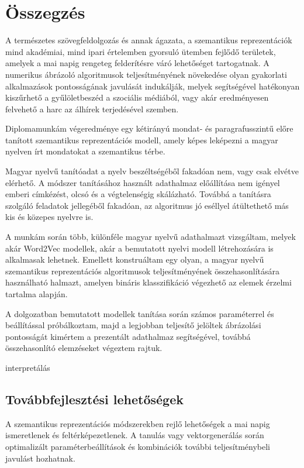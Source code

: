 \chapter{Összegzés} %
\label{ch:sum}

A természetes szövegfeldolgozás és annak ágazata, a szemantikus reprezentációk mind akadémiai, mind ipari értelemben gyorsuló ütemben fejlődő területek, amelyek a mai napig rengeteg felderítésre váró lehetőséget tartogatnak. A numerikus ábrázoló algoritmusok teljesítményének növekedése olyan gyakorlati alkalmazások pontosságának javulását indukálják, melyek segítségével hatékonyan kiszűrhető a gyűlöletbeszéd a szociális médiából, vagy akár eredményesen felvehető a harc az álhírek terjedésével szemben. 

Diplomamunkám végeredménye egy kétirányú mondat- és paragrafusszintű előre tanított szemantikus reprezentációs modell, amely képes leképezni a magyar nyelven írt mondatokat a szemantikus térbe.

Magyar nyelvű tanítóadat a nyelv beszéltségéből fakadóan nem, vagy csak elvétve elérhető. A módszer tanításához használt adathalmaz előállítása nem igényel emberi címkézést, olcsó és a végtelenségig skálázható. Továbbá a tanításra szolgáló feladatok jellegéből fakadóan, az algoritmus jó eséllyel átültethető más kis és közepes nyelvre is.

A munkám során több, különféle magyar nyelvű adathalmazt vizsgáltam, melyek akár Word2Vec modellek, akár a bemutatott nyelvi modell létrehozására is alkalmasak lehetnek. Emellett konstruáltam egy olyan, a magyar nyelvű szemantikus reprezentációs algoritmusok teljesítményének összehasonlítására használható halmazt, amelyen bináris klasszifikáció végezhető az elemek érzelmi tartalma alapján.
 
A dolgozatban bemutatott modellek tanítása során számos paraméterrel és beállítással próbálkoztam, majd a legjobban teljesítő jelöltek ábrázolási pontosságát  kimértem a prezentált adathalmaz segítségével, továbbá összehasonlító elemzéseket végeztem rajtuk.

interpretálás



\section{Továbbfejlesztési lehetőségek}
A szemantikus reprezentációs módszerekben rejlő lehetőségek a mai napig ismeretlenek és feltérképezetlenek. A tanulás vagy vektorgenerálás során optimalizált paraméterbeállítások és kombinációk további teljesítménybeli javulást hozhatnak.

